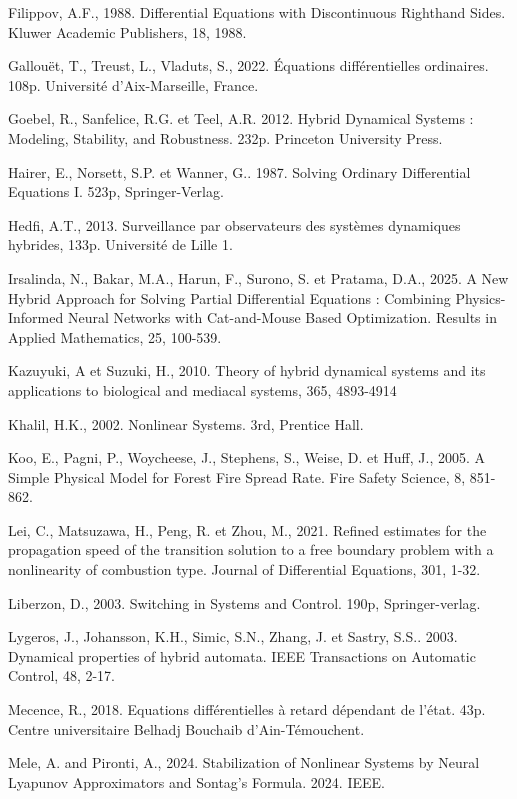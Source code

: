 \documentclass[12pt, oneside]{report} %
\theoremstyle{definition}
\theoremstyle{remark}
\begin{document}
\begin{enumerate}[label={[\arabic*]}, leftmargin=*, align=left, nosep]
		\item Filippov, A.F., 1988. Differential Equations with Discontinuous Righthand Sides. Kluwer Academic Publishers, 18, 1988.
		\item Gallouët, T., Treust, L., Vladuts, S., 2022. Équations différentielles ordinaires. 108p. Université d’Aix-Marseille, France.
		\item Goebel, R., Sanfelice, R.G. et Teel, A.R. 2012. Hybrid Dynamical Systems : Modeling, Stability, and Robustness. 232p. Princeton University Press.
		\item Hairer, E., Norsett, S.P. et Wanner, G.. 1987. Solving Ordinary Differential Equations I. 523p, Springer-Verlag.
		\item Hedfi, A.T., 2013. Surveillance par observateurs des systèmes dynamiques hybrides, 133p. Université de Lille 1.
		\item Irsalinda, N., Bakar, M.A., Harun, F., Surono, S. et Pratama, D.A., 2025. A New Hybrid Approach for Solving Partial Differential Equations : Combining Physics-Informed Neural Networks with Cat-and-Mouse Based Optimization. Results in Applied Mathematics, 	25, 100-539.
		\item Kazuyuki, A et Suzuki, H., 2010. Theory of hybrid dynamical systems and its applications to biological and mediacal systems, 365, 4893-4914 
		\item Khalil, H.K., 2002. Nonlinear Systems. 3rd, Prentice Hall. 
		\item Koo, E., Pagni, P., Woycheese, J., Stephens, S., Weise, D. et Huff, J., 2005. A Simple Physical Model for Forest Fire Spread Rate. Fire Safety Science, 8, 851-862.
		\item Lei, C., Matsuzawa, H., Peng, R. et Zhou, M., 2021. Refined estimates for the propagation speed of the transition solution to a free boundary problem with a nonlinearity of combustion type. Journal of Differential Equations, 301, 1-32.
		\item Liberzon, D., 2003. Switching in Systems and Control. 190p, Springer-verlag.
		\item Lygeros, J., Johansson, K.H., Simic, S.N., Zhang, J. et Sastry, S.S.. 2003. Dynamical properties of hybrid automata. IEEE Transactions on Automatic Control, 48, 2-17.
		\item Mecence, R., 2018. Equations différentielles à retard dépendant de l'état. 43p. Centre universitaire Belhadj Bouchaib d'Ain-Témouchent. 
		\item Mele, A. and Pironti, A., 2024. Stabilization of Nonlinear Systems by Neural Lyapunov Approximators and Sontag’s Formula. 2024. IEEE.

\end{enumerate}
\end{document}
